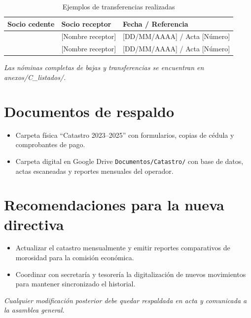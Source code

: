 \begin{table}[H]
\centering
\caption{Ejemplos de transferencias realizadas}
\label{tab:transferencias}
\begin{tabular}{p{3.6cm} p{3.6cm} p{3.8cm}}
\toprule
\textbf{Socio cedente} & \textbf{Socio receptor} & \textbf{Fecha / Referencia} \\
\midrule
[Nombre cedente] & [Nombre receptor] & [DD/MM/AAAA] / Acta [Número] \\
[Nombre cedente] & [Nombre receptor] & [DD/MM/AAAA] / Acta [Número] \\
\bottomrule
\end{tabular}
\end{table}
\textit{Las nóminas completas de bajas y transferencias se encuentran en \emph{anexos/C\_listados/}.}

\section{Documentos de respaldo}

\begin{itemize}[noitemsep, topsep=0pt]
  \item Carpeta física ``Catastro 2023--2025'' con formularios, copias de cédula y comprobantes de pago.
  \item Carpeta digital en Google Drive \texttt{Documentos/Catastro/} con base de datos, actas escaneadas y reportes mensuales del operador.
\end{itemize}

\section{Recomendaciones para la nueva directiva}

\begin{itemize}[noitemsep, topsep=0pt]
  \item Actualizar el catastro mensualmente y emitir reportes comparativos de morosidad para la comisión económica.
  \item Coordinar con secretaría y tesorería la digitalización de nuevos movimientos para mantener sincronizado el historial.
\end{itemize}
\textit{Cualquier modificación posterior debe quedar respaldada en acta y comunicada a la asamblea general.}
